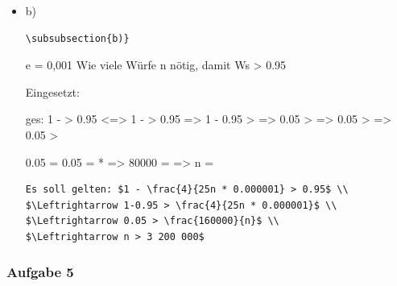 \documentclass[11pt]{article}
\begin{document}
\begin{itemize}
\begin{itemize}
\_20660yzW.png]}

\end{itemize} %

\item b)\\
\label{sec-3-8-5-2}%
\begin{verbatim}
\subsubsection{b)}
\end{verbatim}

e = 0,001
Wie viele Würfe n nötig, damit Ws > 0.95

Eingesetzt:

ges: 1 -  > 0.95
<=> 1 -  > 0.95
=> 1 - 0.95 > 
=> 0.05 >  => 0.05 > 
=> 0.05 > 

0.05 = 
0.05 =  *  
=> 80000 = 
=> n = 
 

\begin{verbatim}
Es soll gelten: $1 - \frac{4}{25n * 0.000001} > 0.95$ \\
$\Leftrightarrow 1-0.95 > \frac{4}{25n * 0.000001}$ \\
$\Leftrightarrow 0.05 > \frac{160000}{n}$ \\
$\Leftrightarrow n > 3 200 000$
\end{verbatim}

\end{itemize} %
\subsubsection{Aufgabe 5}
\label{sec-3-8-6}
\end{document}
